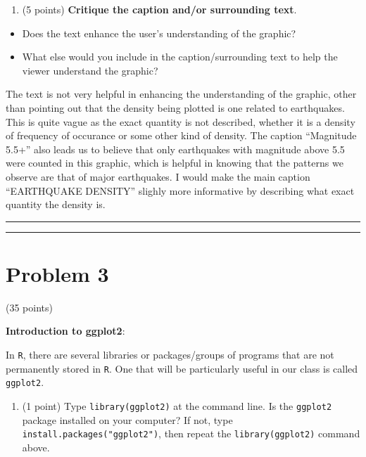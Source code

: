\documentclass[]{article}
\providecommand{\tightlist}{%
  \setlength{\itemsep}{0pt}\setlength{\parskip}{0pt}}
\begin{document}
\begin{enumerate}
\def\labelenumi{\alph{enumi}.}
\setcounter{enumi}{3}
\tightlist
\item
  (5 points) \textbf{Critique the caption and/or surrounding text}.
\end{enumerate}

\begin{itemize}
\tightlist
\item
  Does the text enhance the user's understanding of the graphic?
\item
  What else would you include in the caption/surrounding text to help
  the viewer understand the graphic?
\end{itemize}

The text is not very helpful in enhancing the understanding of the
graphic, other than pointing out that the density being plotted is one
related to earthquakes. This is quite vague as the exact quantity is not
described, whether it is a density of frequency of occurance or some
other kind of density. The caption ``Magnitude 5.5+'' also leads us to
believe that only earthquakes with magnitude above 5.5 were counted in
this graphic, which is helpful in knowing that the patterns we observe
are that of major earthquakes. I would make the main caption
``EARTHQUAKE DENSITY'' slighly more informative by describing what exact
quantity the density is.

\begin{center}\rule{0.5\linewidth}{\linethickness}\end{center}

\begin{center}\rule{0.5\linewidth}{\linethickness}\end{center}

\hypertarget{problem-3}{%
\section{Problem 3}\label{problem-3}}

(35 points)

\textbf{Introduction to ggplot2}:

In \texttt{R}, there are several libraries or packages/groups of
programs that are not permanently stored in \texttt{R}. One that will be
particularly useful in our class is called \texttt{ggplot2}.

\begin{enumerate}
\def\labelenumi{\alph{enumi}.}
\tightlist
\item
  (1 point) Type \texttt{library(ggplot2)} at the command line. Is the
  \texttt{ggplot2} package installed on your computer? If not, type
  \texttt{install.packages("ggplot2")}, then repeat the
  \texttt{library(ggplot2)} command above.
\end{enumerate}
\end{document}
